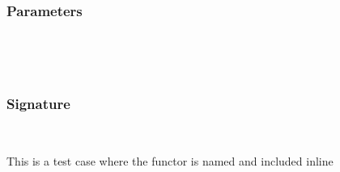 \\
\label{Oxcaml--module-Include_functor_inline}\label{Oxcaml-Include_functor_inline}\begin{ocamlindent}\label{Oxcaml-Include_functor_inline--module-type-Make}\label{Oxcaml-Include_functor_inline-module-type-Make}\begin{ocamlindent}\subsubsection{Parameters\label{Oxcaml-Include_functor_inline-module-type-Make--parameters_5}}%
\label{Oxcaml-Include_functor_inline-module-type-Make--argument-1-_}\label{Oxcaml-Include_functor_inline-module-type-Make-argument-1-_}\begin{ocamlindent}\label{Oxcaml-Include_functor_inline-module-type-Make-argument-1-_--type-t}\\
\end{ocamlindent}%
\\
\subsubsection{Signature\label{Oxcaml-Include_functor_inline-module-type-Make--signature_5}}%
\label{Oxcaml-Include_functor_inline-module-type-Make--type-included}\\
\end{ocamlindent}%
\begin{ocamlindent}This is a test case where the functor is named and included inline\end{ocamlindent}%
\medbreak
\label{Oxcaml-Include_functor_inline--type-t}\\
 \hyperref[Oxcaml-Include_functor_inline-module-type-Make]{}\label{Oxcaml-Include_functor_inline--type-included}\\
\end{ocamlindent}%
